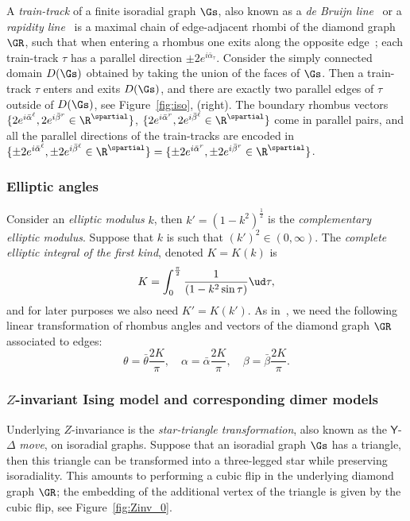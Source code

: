 \documentclass[a4paper,twoside,11pt]{article}
\begin{document}
A \emph{train-track} of a finite isoradial graph $\Gs$, also known 
as a \emph{de Bruijn line}~\cite{deBruijn1,deBruijn2} or a \emph{rapidity line}~\cite{Baxter:Zinv} is 
a maximal chain of edge-adjacent rhombi of the diamond graph $\GR$,
such that when entering a rhombus one exits along the opposite edge~\cite{KeSchlenk}; each train-track $\tau$ has a parallel direction 
$\pm 2e^{i\bar{\alpha}_\tau}$. Consider the simply connected domain $D(\Gs)$ obtained by taking the union of the faces of $\Gs$.
Then a train-track $\tau$ enters and exits $D(\Gs)$, and there are exactly two parallel edges of $\tau$ outside of $D(\Gs)$, see Figure~\ref{fig:iso},
(right). The boundary rhombus vectors $\{2e^{i\bar{\alpha}^\ell}, 2e^{i\bar{\beta}^r}\in\R^\spartial\} $,
$\{2e^{i\bar{\alpha}^r}, 2e^{i\bar{\beta}^\ell}\in\R^\spartial\}$
come in parallel pairs, and all the parallel directions of the train-tracks are encoded in 
$\{\pm 2e^{i\bar{\alpha}^\ell},\pm 2e^{i\bar{\beta}^\ell}\in\R^\spartial\}=\{\pm 2e^{i\bar{\alpha}^r},\pm 2e^{i\bar{\beta}^r}\in\R^\spartial\}$.

\subsubsection{Elliptic angles}\label{sec:elliptic_angles}

Consider an \emph{elliptic modulus} $k$, then $k'=(1-k^2)^{\frac{1}{2}}$ is the \emph{complementary elliptic modulus}. Suppose that
$k$ is such that $(k')^2\in(0,\infty)$. The \emph{complete elliptic integral of the first kind}, denoted 
$K=K(k)$ is
\[
K=\int_{0}^{\frac{\pi}{2}} \frac{1}{(1-k^2\sin\tau)}\ud\tau,
\]
and for later purposes we also need $K'=K(k')$.
As in~\cite{BdTR1,BdtR2}, we need the following linear transformation of rhombus angles and vectors of the diamond graph $\GR$ 
associated to edges:
\begin{equation*}
\theta=\bar{\theta}\frac{2K}{\pi},\quad \alpha=\bar{\alpha}\frac{2K}{\pi},\quad \beta=\bar{\beta}\frac{2K}{\pi}. 
\end{equation*}




\subsubsection{$Z$-invariant Ising model and corresponding dimer models}

Underlying $Z$-invariance is the \emph{star-triangle transformation}, also known as the $\mathsf{Y}$-$\Delta$ \emph{move}, on isoradial graphs.
Suppose that an isoradial graph $\Gs$ has a triangle, then this triangle can be transformed into a three-legged star while preserving 
isoradiality. This amounts to performing a cubic flip in the underlying diamond graph $\GR$; the embedding of the additional vertex of the 
triangle is given by the cubic flip, see Figure~\ref{fig:Zinv_0}. 
\end{document}
